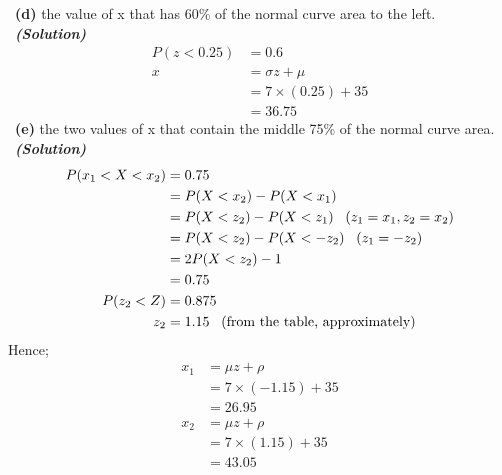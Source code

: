 \documentclass[a4 paper]{article}
\numberwithin{equation}{section}
\newcommand{\subproblem}[1]{~\newline\textbf{(#1)}}
\newcommand{\solution}{~\newline\textbf{\textit{(Solution)}} }
\newcommand{\0}{\mathbf{0}}
\begin{document}
\subproblem{d} the value of x that has 60\% of the normal curve
area to the left.\\
\solution
\begin{align*}
    P (z < 0.25) &= 0.6 \\
    x &= \sigma z + \mu \\
    &= 7\times(0.25) + 35\\
    &= 36.75 
\end{align*}
\newline
\subproblem{e} the two values of x that contain the middle 75\% of
the normal curve area.\\
\solution
\begin{align*}
    P (x_1 < X < x_2 ) &= 0.75\\
    &= P (X < x_2 ) - P (X < x_1 )\\
    &= P (X < z_2 ) - P (X < z_1 ) \;\;\;  \text{($ z_1 = x_1, z_2= x_2$)} \\
    &= P (X < z_2 ) - P (X < -z_2 ) \;\;\;  \text{($ z_1 = -z_2$)} \\
    &= 2P (X < z_2 ) - 1 \\
    &= 0.75 \\
    P (z_2 < Z) &= 0.875 \\
    z_2 &= 1.15 \;\;\; \text{(from the table, approximately)}
\end{align*}
Hence;
\begin{align*}
    x_1 &= \mu z + \rho \\
    &= 7 \times (-1.15) + 35 \\
    &= 26.95 \\
    x_2 &= \mu z + \rho \\
    &= 7 \times (1.15) + 35 \\
    &= 43.05 \\ \\
\end{align*}
\end{document}
